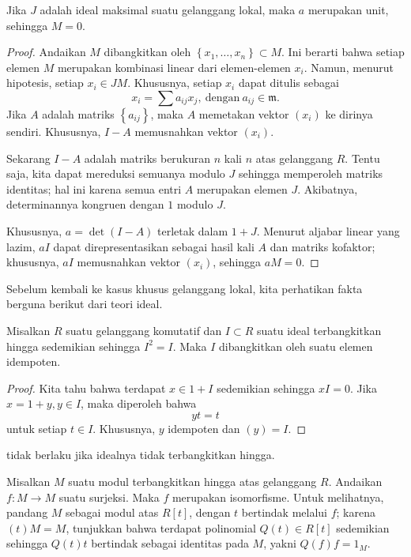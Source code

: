 Jika $J$ adalah ideal maksimal suatu gelanggang lokal, maka $a$ merupakan unit, sehingga $M=0$.

\begin{proof}
Andaikan $M$ dibangkitkan oleh $\left\{x_1, \dots, x_n\right\} \subset M$. Ini
berarti bahwa setiap elemen $M$ merupakan kombinasi linear dari elemen-elemen
$x_i$. Namun, menurut hipotesis, setiap $x_i \in JM$. Khususnya, setiap
$x_i$ dapat ditulis sebagai
\[ x_i = \sum a_{ij} x_j, \ \mathrm{dengan} \ a_{ij} \in \mathfrak{m}.  \]
Jika $A$ adalah matriks $\left\{a_{ij}\right\}$, maka $A$ memetakan
vektor $(x_i)$ ke dirinya sendiri. Khususnya, $I-A$ memusnahkan
vektor $(x_i)$.

Sekarang $I-A$ adalah matriks berukuran $n$ kali $n$ atas gelanggang $R$. Tentu saja, kita dapat
mereduksi semuanya modulo $J$ sehingga memperoleh matriks identitas; hal ini
karena semua entri $A$ merupakan elemen $J$. Akibatnya,
determinannya kongruen dengan $1$ modulo $J$.

Khususnya, $a=\det (I - A)$ terletak dalam $1+J$.  
Menurut aljabar linear yang lazim, $aI$ dapat direpresentasikan sebagai hasil kali $A$
dan matriks kofaktor; khususnya, $aI$ memusnahkan vektor
$(x_i)$, sehingga $aM=0$.
\end{proof}

Sebelum kembali ke kasus khusus gelanggang lokal, kita perhatikan fakta berguna berikut
dari teori ideal.

\begin{proposition}  \label{idempotentideal}
Misalkan $R$ suatu gelanggang komutatif dan $I \subset R$ suatu ideal terbangkitkan hingga sedemikian sehingga $I^2 = I$.
Maka $I$ dibangkitkan oleh suatu elemen idempoten.
\end{proposition} 
\begin{proof} 
Kita tahu bahwa terdapat $x \in 1+I$ sedemikian sehingga $xI =0$. Jika $x = 1+y, y \in I$, maka
diperoleh bahwa 
\[ yt = t  \]
untuk setiap $t \in I$. Khususnya, $y$ idempoten dan $(y) = I$.
\end{proof} 

\begin{exercise} 
 tidak berlaku jika idealnya tidak terbangkitkan hingga.
\end{exercise} 

\begin{exercise} 
Misalkan $M$ suatu modul terbangkitkan hingga atas gelanggang $R$. Andaikan $f: M \to M$
suatu surjeksi. Maka $f$ merupakan isomorfisme. Untuk melihatnya, pandang $M$ sebagai
modul atas $R[t]$, dengan $t$ bertindak melalui $f$; karena $(t)M = M$, tunjukkan bahwa
terdapat polinomial $Q(t) \in R[t]$ sedemikian sehingga $Q(t)t$ bertindak sebagai identitas pada
$M$, yakni $Q(f)f=1_M$.
\end{exercise} 

